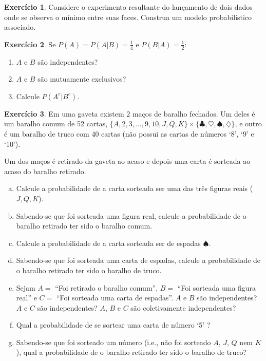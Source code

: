 \documentclass[12pt,a4paper]{article}
\theoremstyle{definition}
\newtheorem{exercise}{Exercício}
\begin{document}
\begin{exercise}
Considere o experimento resultante do lançamento de dois dados onde se
observa o mínimo entre suas faces. Construa um modelo probabilístico associado.
\end{exercise}

\begin{exercise}
Se $P(A)=P(A|B)=\frac{1}{4}$ e $P(B|A)=\frac{1}{2}$:
\begin{enumerate}
\item $A$ e $B$ são independentes?
\item $A$ e $B$ são mutuamente exclusivos?
\item Calcule $P(A^c|B^c)$.
\end{enumerate}
\end{exercise}

\begin{exercise}
Em uma gaveta existem 2 maços de baralho fechados.
Um deles é um baralho comum de 52 cartas, $\{A,2,3,\dots,9,10,J,Q,K\} \times \{ \clubsuit,\heartsuit,\spadesuit,\diamondsuit \}$, e outro é um baralho de truco com 40 cartas (não possui as cartas de números `8', `9' e `10').

Um dos maços é retirado da gaveta ao acaso e depois uma carta é sorteada ao acaso do baralho retirado.

\begin{enumerate}[(a)]
\item
Calcule a probabilidade de a carta sorteada ser uma das três figuras reais ($J,Q,K$).
\item
Sabendo-se que foi sorteada uma figura real, calcule a probabilidade de o baralho retirado ter sido o baralho comum.
\item
Calcule a probabilidade de a carta sorteada ser de espadas $\spadesuit$.
\item
Sabendo-se que foi sorteada uma carta de espadas, calcule a probabilidade de o baralho retirado ter sido o baralho de truco.
\item
Sejam $A=$ ``Foi retirado o baralho comum'',
$B=$ ``Foi sorteada uma figura real'' e
$C=$ ``Foi sorteada uma carta de espadas''.
$A$ e $B$ são independentes?
$A$ e $C$ são independentes?
$A$, $B$ e $C$ são coletivamente independentes?
\item
Qual a probabilidade de se sortear uma carta de número `5' ?
\item
Sabendo-se que foi sorteado um número (i.e., não foi sorteado $A$, $J$, $Q$ nem $K$), qual a probabilidade de o baralho retirado ter sido o baralho de truco?
\end{enumerate}
\end{exercise}
\end{document}

